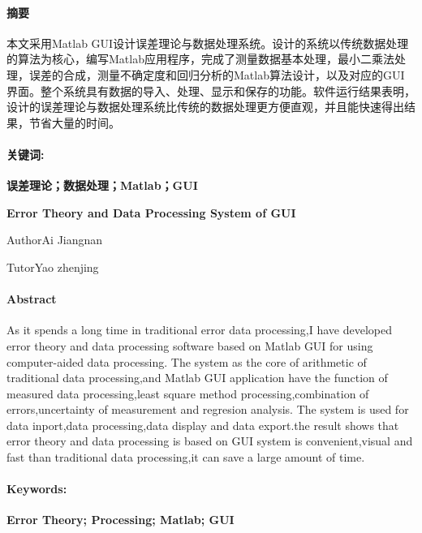 \paragraph{摘要}{\kaishu {} 本文采用Matlab GUI设计误差理论与数据处理系统。设计的系统以传统数据处理的算法为核心，编写Matlab应用程序，完成了测量数据基本处理，最小二乘法处理，误差的合成，测量不确定度和回归分析的Matlab算法设计，以及对应的GUI界面。整个系统具有数据的导入、处理、显示和保存的功能。软件运行结果表明，设计的误差理论与数据处理系统比传统的数据处理更方便直观，并且能快速得出结果，节省大量的时间。}

\vspace{2em}
\paragraph{关键词:}\textbf{ 误差理论；数据处理；Matlab；GUI}
\newpage
\thispagestyle{empty}
\begin{center}
	\textbf{\heiti {} Error Theory and Data Processing System of GUI}
	
	\vspace{1em}
	Author\quad Ai Jiangnan
	
	Tutor\quad Yao zhenjing
\end{center}
\vspace{2em}
\paragraph{Abstract}{ As it spends a long time in traditional error data processing,I have developed error theory and data processing software based on Matlab GUI for using computer-aided data processing. The system as the core of arithmetic of traditional data processing,and Matlab GUI application have  the function of measured data processing,least square method processing,combination of errors,uncertainty of measurement and regresion analysis. The system is used for data inport,data processing,data display and data export.the result shows that error theory and data processing is based on GUI system is convenient,visual and fast than traditional data processing,it can save a large amount of time.}
\vspace{2em}
\paragraph{Keywords:}\textbf{ Error Theory; Processing; Matlab; GUI}
\newpage
{}
\begin{center}
	\tableofcontents
\end{center}
\thispagestyle{empty}